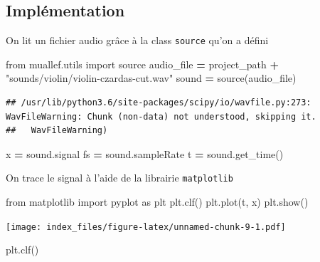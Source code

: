 \documentclass[]{article}
\newenvironment{Shaded}{\begin{snugshade}}{\end{snugshade}}
\newcommand{\ImportTok}[1]{#1}
\newcommand{\NormalTok}[1]{#1}
\newcommand{\OperatorTok}[1]{\textcolor[rgb]{0.81,0.36,0.00}{\textbf{#1}}}
\newcommand{\StringTok}[1]{\textcolor[rgb]{0.31,0.60,0.02}{#1}}
\begin{document}
\hypertarget{implementation}{%
\subsection{Implémentation}\label{implementation}}

On lit un fichier audio grâce à la class \texttt{source} qu'on a défini

\begin{Shaded}
\begin{Highlighting}[]
\ImportTok{from}\NormalTok{ muallef.utils }\ImportTok{import}\NormalTok{ source}
\NormalTok{audio_file }\OperatorTok{=}\NormalTok{ project_path }\OperatorTok{+} \StringTok{"sounds/violin/violin-czardas-cut.wav"}
\NormalTok{sound }\OperatorTok{=}\NormalTok{ source(audio_file)}
\end{Highlighting}
\end{Shaded}

\begin{verbatim}
## /usr/lib/python3.6/site-packages/scipy/io/wavfile.py:273: WavFileWarning: Chunk (non-data) not understood, skipping it.
##   WavFileWarning)
\end{verbatim}

\begin{Shaded}
\begin{Highlighting}[]
\NormalTok{x }\OperatorTok{=}\NormalTok{ sound.signal}
\NormalTok{fs }\OperatorTok{=}\NormalTok{ sound.sampleRate}
\NormalTok{t }\OperatorTok{=}\NormalTok{ sound.get_time()}
\end{Highlighting}
\end{Shaded}

On trace le signal à l'aide de la librairie \texttt{matplotlib}

\begin{Shaded}
\begin{Highlighting}[]
\ImportTok{from}\NormalTok{ matplotlib }\ImportTok{import}\NormalTok{ pyplot }\ImportTok{as}\NormalTok{ plt}
\NormalTok{plt.clf()}
\NormalTok{plt.plot(t, x)}
\NormalTok{plt.show()}
\end{Highlighting}
\end{Shaded}

\texttt{[image: index\_files/figure-latex/unnamed-chunk-9-1.pdf]}

\begin{Shaded}
\begin{Highlighting}[]
\NormalTok{plt.clf()}
\end{Highlighting}
\end{Shaded}
\end{document}
